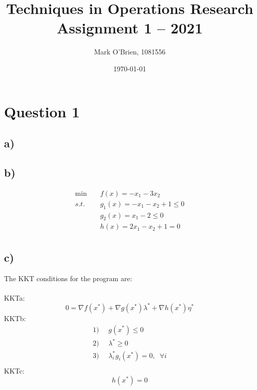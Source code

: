 \documentclass{article}
\title{Techniques in Operations Research\\ Assignment 1 -- 2021}
\author{Mark O'Brien, 1081556}
\date{\today}
\begin{document}
\maketitle
\section*{Question 1}
\subsection*{a)}\label{ssec:name}


\subsection*{b)}\label{ssec:name}
\begin{align*}
\min\;\;\;\;&f(x)=-x_1-3x_2\\
s.t. \;\;\;\;&g_1(x)=-x_1-x_2+1\leq0\\
&g_2(x)=x_1-2\leq0\\
&h(x)=2x_1-x_2+1=0\\
\end{align*}

\subsection*{c)}\label{ssec:name}
The KKT conditions for the program are:\\
\\
\hspace*{10mm}
KKTa: 
$$0 = \nabla f(x^*)+\nabla g(x^*)\lambda^* + \nabla h(x^*)\eta^*$$
\hspace*{10mm}
KKTb:
\begin{align*}
1)&\;\;g(x^*)\leq0\\
2)&\;\;\lambda^*\geq0\\
3)&\;\;\lambda_i^*g_i(x^*)=0,\;\;\forall i\\
\end{align*}
\hspace*{10mm}
KKTc:
$$h(x^*)=0$$

\end{document}

